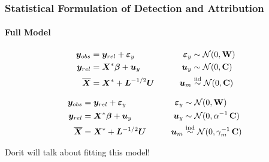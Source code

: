 \documentclass{beamer}
\newcommand{\C}{\ensuremath{\text{Cov}}}
\newcommand{\iid}{\ensuremath{\stackrel{\text{iid}}{\sim}}}
\def\*#1{\bm{#1}}
\def\C{\textbf{\text{C}}}
\def\W{\textbf{\text{W}}}
\begin{document}
\begin{frame}
\frametitle{Statistical Formulation of Detection and Attribution}
\framesubtitle{Full Model}

\begin{block}{}
\vspace*{-\baselineskip}\setlength\belowdisplayshortskip{0pt}
\begin{alignat*}{3}
\*y_{obs} &= \*y_{rel} + \*\varepsilon_y  \qquad \quad &\*\varepsilon_y &\sim \mathcal N(0,\W)\\
\*y_{rel} &= \*X^* \*\beta + \*u_y \nonumber  \qquad  &\*u_y &\sim \mathcal N(0,\C) \\
\overline{\*X} &= \*X^* + \*L^{-1/2} \*U \qquad    &\*u_m &\iid \mathcal N(0,\C)  \:
\end{alignat*}
\end{block}

\begin{exampleblock}{}
\vspace*{-\baselineskip}\setlength\belowdisplayshortskip{0pt}
\begin{alignat*}{3}
\*y_{obs} &= \*y_{rel} + \*\varepsilon_y  \qquad \quad &\*\varepsilon_y &\sim \mathcal N(0,\W)\\
\*y_{rel} &= \*X^* \*\beta + \*u_y \nonumber  \qquad  &\*u_y &\sim \mathcal N(0,\alpha^{-1}\,\C) \\
\overline{\*X} &= \*X^* + \*L^{-1/2} \*U \qquad    &\*u_m &\stackrel{\text{ind}}{\sim} \mathcal N(0,\gamma_m^{-1} \, \C)  \:
\end{alignat*}
\end{exampleblock}

\alert{Dorit will talk about fitting this model!}
\end{frame}


\end{document}
